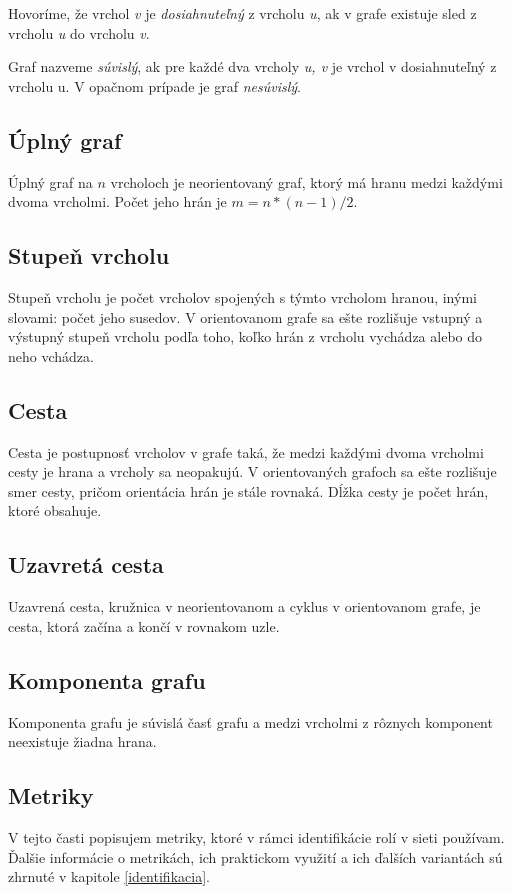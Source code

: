 \documentclass[slovak,master,public,dept460,male,cpdeclaration,oneside]{diploma}
\begin{document}
Hovoríme, že vrchol \textit{v} je \textit{dosiahnuteľný} z vrcholu \textit{u}, ak v grafe existuje sled z vrcholu \textit{u} do vrcholu \textit{v}.

Graf nazveme \textit{súvislý}, ak pre každé dva vrcholy \textit{u, v} je vrchol v dosiahnuteľný z vrcholu u. V opačnom prípade je graf \textit{nesúvislý}.

\subsection{Úplný graf}

Úplný graf na ${n}$ vrcholoch je neorientovaný graf, ktorý má hranu medzi každými dvoma vrcholmi. Počet jeho hrán je ${m = n * ( n - 1) / 2}$.

\subsection{Stupeň vrcholu}

Stupeň vrcholu je počet vrcholov spojených s týmto vrcholom hranou, inými slovami: počet jeho susedov. V orientovanom grafe sa ešte rozlišuje vstupný a výstupný stupeň vrcholu podľa toho, koľko hrán z vrcholu vychádza alebo do neho vchádza.

\subsection{Cesta}

Cesta je postupnosť vrcholov v grafe taká, že medzi každými dvoma vrcholmi cesty je hrana a vrcholy sa neopakujú. V orientovaných grafoch sa ešte rozlišuje smer cesty, pričom orientácia hrán je stále rovnaká. Dĺžka cesty je počet hrán, ktoré obsahuje.

\subsection{Uzavretá cesta}

Uzavrená cesta, kružnica v neorientovanom a cyklus v orientovanom grafe, je cesta, ktorá začína a končí v rovnakom uzle.

\subsection{Komponenta grafu}

Komponenta grafu je súvislá časť grafu a medzi vrcholmi z rôznych komponent neexistuje žiadna hrana.

\subsection{Metriky}
V tejto časti popisujem metriky, ktoré v rámci identifikácie rolí v sieti používam. Ďalšie informácie o metrikách, ich praktickom využití a ich ďalších variantách sú zhrnuté v kapitole \ref{identifikacia}.
\end{document}

